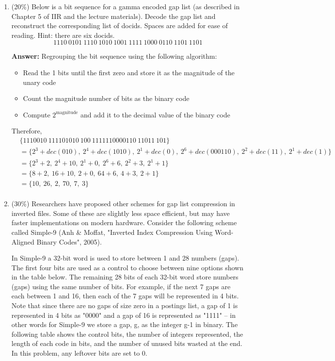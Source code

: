 \documentclass[11pt]{article}
\begin{document}
\begin{enumerate}
\begin{enumerate}
        \end{enumerate}

        \item (20\%) Below is a bit sequence for a gamma encoded gap list (as described in Chapter 5 of IIR and the lecture materials). Decode the gap list and reconstruct the corresponding list of docids. Spaces are added for ease of reading.
        Hint: there are six docids.
        \[ 1110 \ 0101 \ 1110 \ 1010 \ 1001 \ 1111 \ 1000 \ 0110 \ 1101 \ 1101 \]

        \textbf{Answer:} Regrouping the bit sequence using the following algorithm:
        \begin{itemize}
            \item Read the 1 bits until the first zero and store it as the magnitude of the unary code
            \item Count the magnitude number of bits as the binary code
            \item Compute $2^\text{magnitude}$ and add it to the decimal value of the binary code
        \end{itemize}

        Therefore,
        \begin{align*}
            &\{1110 010 \ 11110 1010 \ 10 0 \ 1111110 000110 \ 110 11 \ 10 1 \}\\
            &= \{2^3 + dec(010), \ 2^4 +  dec(1010), \ 2^1 + dec(0), \ 2^6 + dec(000110), \ 2^2 + dec(11), \ 2^1 + dec(1)\} \\
            &= \{2^3 + 2, \ 2^4 +  10, \ 2^1 + 0, \ 2^6 + 6, \ 2^2 + 3, \ 2^1 + 1\} \\
            &= \{8 + 2, \ 16 + 10, \ 2 + 0, \ 64 + 6, \ 4 + 3, \ 2 + 1\} \\
            &= \{10, \ 26, \ 2, \ 70, \ 7, \ 3\} \\
        \end{align*}

        \item (30\%) Researchers have proposed other schemes for gap list compression in inverted files. Some of these are slightly less space efficient, but may have faster implementations on modern hardware. Consider the following scheme called Simple-9 (Anh \& Moffat, "Inverted Index Compression Using Word-Aligned Binary Codes", 2005).
        
        In Simple-9 a 32-bit word is used to store between 1 and 28 numbers (gaps). The first four bits are used as a control to choose between nine options shown in the table below. The remaining 28 bits of each 32-bit word store numbers (gaps) using the same number of bits. For example, if the next 7 gaps are each between 1 and 16, then each of the 7 gaps will be represented in 4 bits. Note that since there are no gaps of size zero in a postings list, a gap of 1 is represented in 4 bits as "0000" and a gap of 16 is represented as "1111" -- in other words for Simple-9 we store a gap, g, as the integer g-1 in binary. The following table shows the control bits, the number of integers represented, the length of each code in bits, and the number of unused bits wasted at the end. In this problem, any leftover bits are set to 0.


\end{enumerate}
\end{document}
